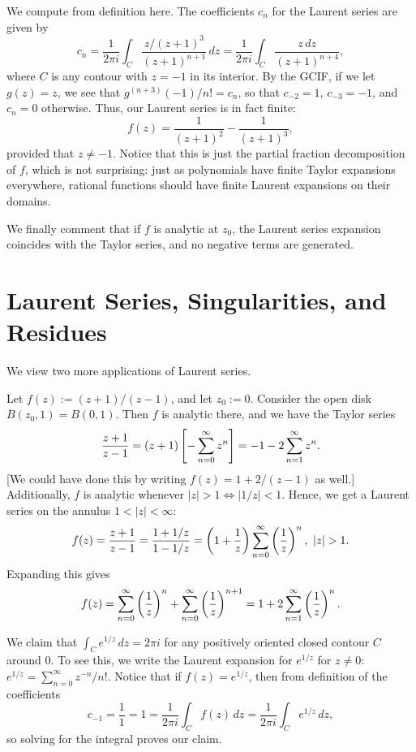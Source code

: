 \documentclass{article}
\begin{document}
\begin{solution}
We compute from definition here. The coefficients $c_n$ for the Laurent series are given by
$$c_n = \frac 1{2\pi i}\int_C \frac{z/(z+1)^3}{(z + 1)^{n+1}}\, dz= \frac 1{2\pi i}\int_C \frac{z\, dz}{(z+1)^{n+4}},$$
where $C$ is any contour with $z=-1$ in its interior. By the GCIF, if we let $g(z) = z$, we see that $g^{(n+3)}(-1)/n! = c_n$, so that $c_{-2} = 1$, $c_{-3} = -1$, and $c_n = 0$ otherwise. Thus, our Laurent series is in fact finite:
$$f(z) = \boxed{\frac 1{(z+1)^2} - \frac 1{(z + 1)^3}},$$
provided that $z\neq -1$. Notice that this is just the partial fraction decomposition of $f$, which is not surprising: just as polynomials have finite Taylor expansions everywhere, rational functions should have finite Laurent expansions on their domains.
\end{solution}
We finally comment that if $f$ is analytic at $z_0$, the Laurent series expansion coincides with the Taylor series, and no negative terms are generated.

\setcounter{section}{89}
\section{Laurent Series, Singularities, and Residues}
We view two more applications of Laurent series.
\begin{example}
Let $f(z) := (z+1)/(z-1)$, and let $z_0 := 0$. Consider the open disk $B(z_0, 1) = B(0, 1)$. Then $f$ is analytic there, and we have the Taylor series
$$\frac{z+1}{z-1} = (z+1)\left[-\sum_{n=0}^\infty z^n\right] = -1 - 2\sum_{n=1}^\infty z^n.$$
[We could have done this by writing $f(z) = 1 + 2/(z-1)$ as well.] Additionally, $f$ is analytic whenever $|z|>1 \iff |1/z|<1$. Hence, we get a Laurent series on the annulus $1 < |z| < \infty$:
$$f(z) = \frac{z+1}{z-1} = \frac{1+1/z}{1-1/z} = \paren{1 + \frac 1z}\sum_{n=0}^\infty \paren{\frac 1z}^n,\,\, |z|>1.$$
Expanding this gives
$$f(z) = \sum_{n=0}^\infty \left(\frac1z \right)^n + \sum_{n=0}^\infty \left(\frac1z \right)^{n+1} = 1 + 2\sum_{n=1}^\infty \left(\frac 1z \right)^n.$$
\end{example}
\begin{example}
We claim that $\int_C e^{1/z}\,dz = 2\pi i$ for any positively oriented closed contour $C$ around $0$. To see this, we write the Laurent expansion for $e^{1/z}$ for $z\neq 0$: $e^{1/z} = \sum_{n=0}^\infty z^{-n}/n!$. Notice that if $f(z) = e^{1/z}$, then from definition of the coefficients
$$c_{-1} = \frac 11 = 1 = \frac 1{2\pi i}\int_C f(z)\, dz = \frac 1{2\pi i}\int_C e^{1/z}\, dz,$$
so solving for the integral proves our claim.
\end{example}
\end{document}
